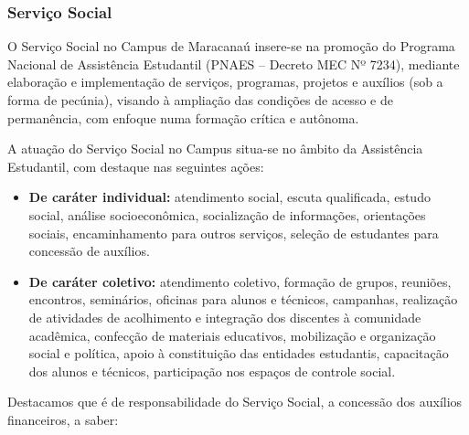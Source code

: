 \subsubsection{Serviço Social}

O Serviço Social no Campus de Maracanaú insere-se na promoção do Programa Nacional de Assistência Estudantil (PNAES – Decreto MEC Nº 7234), mediante elaboração e implementação de serviços, programas, projetos e auxílios (sob a forma de pecúnia), visando à ampliação das condições de acesso e de permanência, com enfoque numa formação crítica e autônoma.

A atuação do Serviço Social no Campus situa-se no âmbito da Assistência Estudantil, com destaque nas seguintes ações:

\begin{itemize}
	\item \textbf{De caráter individual:} atendimento social, escuta qualificada, estudo social, análise socioeconômica, socialização de informações, orientações sociais, encaminhamento para outros serviços, seleção de estudantes para concessão de auxílios.
	\item \textbf{De caráter coletivo:} atendimento coletivo, formação de grupos, reuniões, encontros, seminários, oficinas para alunos e técnicos, campanhas, realização de atividades de acolhimento e integração dos discentes à comunidade acadêmica, confecção de materiais educativos, mobilização e organização social e política, apoio à constituição das entidades estudantis, capacitação dos alunos e técnicos, participação nos espaços de controle social.
\end{itemize}

Destacamos que é de responsabilidade do Serviço Social, a concessão dos auxílios financeiros, a saber: 

